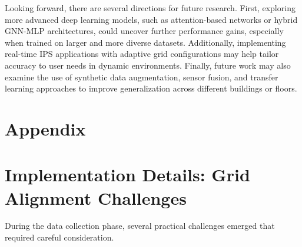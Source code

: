 \documentclass[runningheads]{llncs}
\begin{document}
Looking forward, there are several directions for future research. First, exploring more advanced deep learning models, such as attention-based networks or hybrid GNN-MLP architectures, could uncover further performance gains, especially when trained on larger and more diverse datasets. Additionally, implementing real-time IPS applications with adaptive grid configurations may help tailor accuracy to user needs in dynamic environments. Finally, future work may also examine the use of synthetic data augmentation, sensor fusion, and transfer learning approaches to improve generalization across different buildings or floors.

%
%



\newpage

\appendix

\section*{Appendix}

\section{Implementation Details: Grid Alignment Challenges}

During the data collection phase, several practical challenges emerged that required careful consideration.
\end{document}
